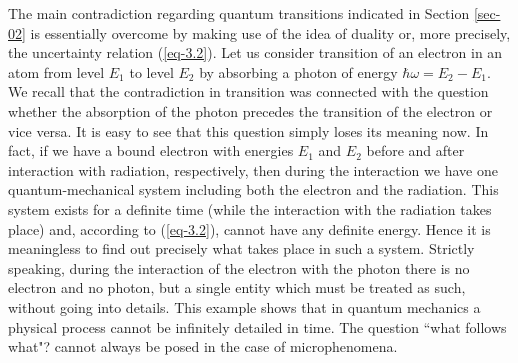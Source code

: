 \documentclass[a4paper,sfsidenotes,colorlinks=true]{tufte-book}
\numberwithin{equation}{section}
\numberwithin{figure}{section}
\begin{document}
The 
main contradiction regarding quantum transitions indicated in Section
\ref{sec-02} is essentially overcome by making use of the idea of
duality or, more precisely, the uncertainty relation
(\ref{eq-3.2}). Let us consider transition of an electron in an atom
from level $E_{1}$ to level $E_{2}$ by absorbing a photon of energy
$\hbar \omega = E_{2} - E_{1}$. We recall that the contradiction in
transition was connected with the question whether the absorption of
the photon precedes the transition of the electron or vice versa. It
is easy to see that this question simply loses its meaning now. In
fact, if we have a bound electron with energies $E_{1}$ and $E_{2}$
before and after interaction with radiation, respectively, then during
the interaction we have one quantum-mechanical system including both
the electron and the radiation. This system exists for a definite time
(while the interaction with the radiation takes place) and, according
to (\ref{eq-3.2}), cannot have any definite energy. Hence it is
meaningless to find out precisely what takes place in such a
system. Strictly speaking, during the interaction of the electron with
the photon there is no electron and no photon, but a single entity
which must be treated as such, without going into details. This
example shows that in quantum mechanics a physical process cannot be
infinitely detailed in time. The question ``what follows what"? cannot
always be posed in the case of microphenomena.
\end{document}
